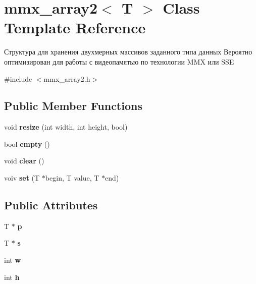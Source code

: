 \hypertarget{classmmx__array2}{\section{mmx\+\_\+array2$<$ T $>$ Class Template Reference}
\label{classmmx__array2}
}


Структура для хранения двухмерных массивов заданного типа данных Вероятно оптимизирован для работы с видеопамятью по технологии M\+M\+X или S\+S\+E  




{\ttfamily \#include $<$mmx\+\_\+array2.\+h$>$}

\subsection*{Public Member Functions}
\begin{DoxyCompactItemize}
\item 
\hypertarget{classmmx__array2_ab91171378bb852edb5c539ff9f1b1ba0}{void {\bfseries resize} (int width, int height, bool)}\label{classmmx__array2_ab91171378bb852edb5c539ff9f1b1ba0}

\item 
\hypertarget{classmmx__array2_a5fa7fe8a409091b6d1ae664a80552307}{bool {\bfseries empty} ()}\label{classmmx__array2_a5fa7fe8a409091b6d1ae664a80552307}

\item 
\hypertarget{classmmx__array2_a67c8a4790849f483deb9a7113f78a178}{void {\bfseries clear} ()}\label{classmmx__array2_a67c8a4790849f483deb9a7113f78a178}

\item 
\hypertarget{classmmx__array2_a94c4f955e93cefb4d8cd072669d981bb}{voiv {\bfseries set} (T $\ast$begin, T value, T $\ast$end)}\label{classmmx__array2_a94c4f955e93cefb4d8cd072669d981bb}

\end{DoxyCompactItemize}
\subsection*{Public Attributes}
\begin{DoxyCompactItemize}
\item 
\hypertarget{classmmx__array2_af58c57c4dbbe49a06d90d077498f9a3c}{T $\ast$ {\bfseries p}}\label{classmmx__array2_af58c57c4dbbe49a06d90d077498f9a3c}

\item 
\hypertarget{classmmx__array2_a010e161d462fb8026ed80d00cdbacb57}{T $\ast$ {\bfseries s}}\label{classmmx__array2_a010e161d462fb8026ed80d00cdbacb57}

\item 
\hypertarget{classmmx__array2_aaa57fdc3151aefd7e9019db52310e222}{int {\bfseries w}}\label{classmmx__array2_aaa57fdc3151aefd7e9019db52310e222}

\item 
\hypertarget{classmmx__array2_a5466374e097f5bb0b5999cf25a813155}{int {\bfseries h}}\label{classmmx__array2_a5466374e097f5bb0b5999cf25a813155}

\end{DoxyCompactItemize}


